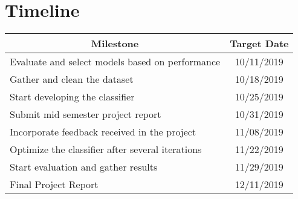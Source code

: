 \documentclass[11pt,letterpaper]{article}
\begin{document}
\section{Timeline}

\begin{center}
{\renewcommand{\arraystretch}{1.2}
\begin{tabular}{|l|c|}
\hline
\multicolumn{1}{|c|}{\textbf{Milestone}}         & \textbf{Target Date} \\ \hline
Evaluate and select models based on performance  & 10/11/2019           \\ \hline
Gather and clean the dataset                     & 10/18/2019           \\ \hline
Start developing the classifier                  & 10/25/2019           \\ \hline
Submit mid semester project report               & 10/31/2019           \\ \hline
Incorporate feedback received in the project     & 11/08/2019           \\ \hline
Optimize the classifier after several iterations & 11/22/2019           \\ \hline
Start evaluation and gather results              & 11/29/2019           \\ \hline
Final Project Report                             & 12/11/2019           \\ \hline
\end{tabular}
}
\end{center}



\end{document}
